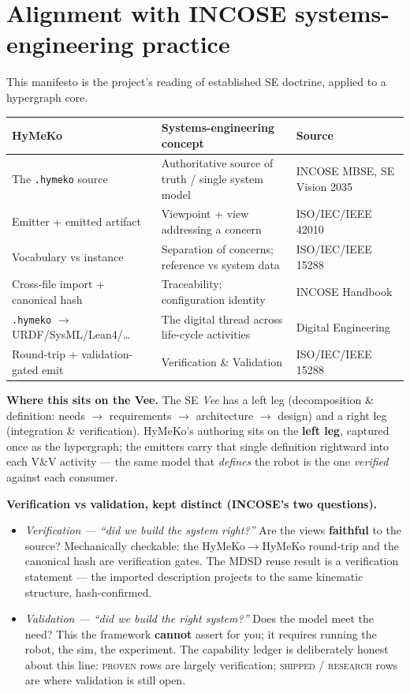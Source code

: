 \documentclass[11pt]{article}
\newcommand{\code}[1]{\texttt{\small #1}}
\begin{document}
\section{Alignment with INCOSE systems-engineering practice}
This manifesto is the project's reading of established SE doctrine, applied to a hypergraph core.

\begin{center}\small
\begin{tabular}{@{}p{5.4cm}p{6.0cm}p{3.6cm}@{}}
\toprule
\textbf{HyMeKo} & \textbf{Systems-engineering concept} & \textbf{Source} \\
\midrule
The \code{.hymeko} source & Authoritative source of truth / single system model & INCOSE MBSE, SE Vision 2035 \\
Emitter + emitted artifact & Viewpoint + view addressing a concern & ISO/IEC/IEEE 42010 \\
Vocabulary vs instance & Separation of concerns; reference vs system data & ISO/IEC/IEEE 15288 \\
Cross-file import + canonical hash & Traceability; configuration identity & INCOSE Handbook \\
\code{.hymeko} $\to$ URDF/SysML/Lean4/\dots & The digital thread across life-cycle activities & Digital Engineering \\
Round-trip + validation-gated emit & Verification \& Validation & ISO/IEC/IEEE 15288 \\
\bottomrule
\end{tabular}
\end{center}

\textbf{Where this sits on the Vee.} The SE \emph{Vee} has a left leg (decomposition \& definition:
needs $\to$ requirements $\to$ architecture $\to$ design) and a right leg (integration \&
verification). HyMeKo's authoring sits on the \textbf{left leg}, captured once as the hypergraph; the
emitters carry that single definition rightward into each V\&V activity --- the same model that
\emph{defines} the robot is the one \emph{verified} against each consumer.

\textbf{Verification vs validation, kept distinct (INCOSE's two questions).}
\begin{itemize}[nosep]
  \item \emph{Verification --- ``did we build the system right?''} Are the views \textbf{faithful} to
        the source? Mechanically checkable: the HyMeKo$\to$HyMeKo round-trip and the canonical hash
        are verification gates. The MDSD reuse result is a verification statement --- the imported
        description projects to the same kinematic structure, hash-confirmed.
  \item \emph{Validation --- ``did we build the right system?''} Does the model meet the need? This
        the framework \textbf{cannot} assert for you; it requires running the robot, the sim, the
        experiment. The capability ledger is deliberately honest about this line: \textsc{proven}
        rows are largely verification; \textsc{shipped} / \textsc{research} rows are where validation
        is still open.
\end{itemize}
\end{document}
